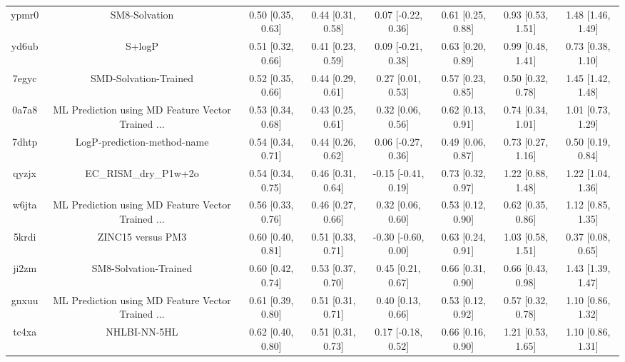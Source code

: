 \documentclass{article}
\begin{document}
\begin{center}
\begin{longtable}{|cccccccc|}
 ypmr0 &                                      SM8-Solvation &  0.50 [0.35, 0.63] &  0.44 [0.31, 0.58] &    0.07 [-0.22, 0.36] &  0.61 [0.25, 0.88] &    0.93 [0.53, 1.51] &     1.48 [1.46, 1.49] \\
 yd6ub &                                             S+logP &  0.51 [0.32, 0.66] &  0.41 [0.23, 0.59] &    0.09 [-0.21, 0.38] &  0.63 [0.20, 0.89] &    0.99 [0.48, 1.41] &     0.73 [0.38, 1.10] \\
 7egyc &                              SMD-Solvation-Trained &  0.52 [0.35, 0.66] &  0.44 [0.29, 0.61] &     0.27 [0.01, 0.53] &  0.57 [0.23, 0.85] &    0.50 [0.32, 0.78] &     1.45 [1.42, 1.48] \\
 0a7a8 &  ML Prediction using MD Feature Vector Trained ... &  0.53 [0.34, 0.68] &  0.43 [0.25, 0.61] &     0.32 [0.06, 0.56] &  0.62 [0.13, 0.91] &    0.74 [0.34, 1.01] &     1.01 [0.73, 1.29] \\
 7dhtp &                        LogP-prediction-method-name &  0.54 [0.34, 0.71] &  0.44 [0.26, 0.62] &    0.06 [-0.27, 0.36] &  0.49 [0.06, 0.87] &    0.73 [0.27, 1.16] &     0.50 [0.19, 0.84] \\
 qyzjx &                              EC\_RISM\_dry\_P1w+2o &  0.54 [0.34, 0.75] &  0.46 [0.31, 0.64] &   -0.15 [-0.41, 0.19] &  0.73 [0.32, 0.97] &    1.22 [0.88, 1.48] &     1.22 [1.04, 1.36] \\
 w6jta &  ML Prediction using MD Feature Vector Trained ... &  0.56 [0.33, 0.76] &  0.46 [0.27, 0.66] &     0.32 [0.06, 0.60] &  0.53 [0.12, 0.90] &    0.62 [0.35, 0.86] &     1.12 [0.85, 1.35] \\
 5krdi &                                  ZINC15 versus PM3 &  0.60 [0.40, 0.81] &  0.51 [0.33, 0.71] &   -0.30 [-0.60, 0.00] &  0.63 [0.24, 0.91] &    1.03 [0.58, 1.51] &     0.37 [0.08, 0.65] \\
 ji2zm &                              SM8-Solvation-Trained &  0.60 [0.42, 0.74] &  0.53 [0.37, 0.70] &     0.45 [0.21, 0.67] &  0.66 [0.31, 0.90] &    0.66 [0.43, 0.98] &     1.43 [1.39, 1.47] \\
 gnxuu &  ML Prediction using MD Feature Vector Trained ... &  0.61 [0.39, 0.80] &  0.51 [0.31, 0.71] &     0.40 [0.13, 0.66] &  0.53 [0.12, 0.92] &    0.57 [0.32, 0.78] &     1.10 [0.86, 1.32] \\
 tc4xa &                                       NHLBI-NN-5HL &  0.62 [0.40, 0.80] &  0.51 [0.31, 0.73] &    0.17 [-0.18, 0.52] &  0.66 [0.16, 0.90] &    1.21 [0.53, 1.65] &     1.10 [0.86, 1.31] \\

\end{longtable}
\end{center}
\end{document}
